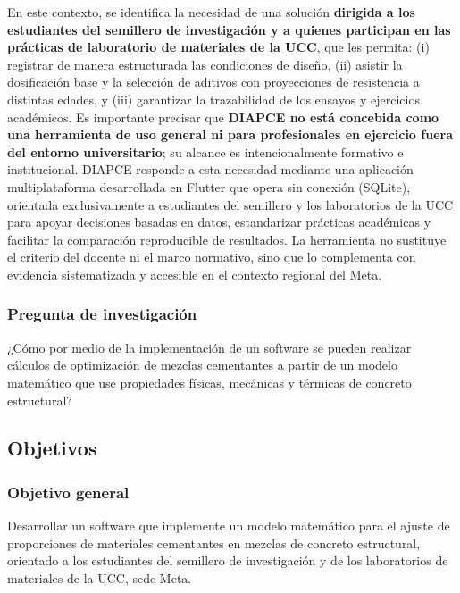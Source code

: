 En este contexto, se identifica la necesidad de una solución \textbf{dirigida a los estudiantes del semillero de investigación y a quienes participan en las prácticas de laboratorio de materiales de la UCC}, que les permita: (i) registrar de manera estructurada las condiciones de diseño, (ii) asistir la dosificación base y la selección de aditivos con proyecciones de resistencia a distintas edades, y (iii) garantizar la trazabilidad de los ensayos y ejercicios académicos. Es importante precisar que \textbf{DIAPCE no está concebida como una herramienta de uso general ni para profesionales en ejercicio fuera del entorno universitario}; su alcance es intencionalmente formativo e institucional. DIAPCE responde a esta necesidad mediante una aplicación multiplataforma desarrollada en Flutter que opera sin conexión (SQLite), orientada exclusivamente a estudiantes del semillero y los laboratorios de la UCC para apoyar decisiones basadas en datos, estandarizar prácticas académicas y facilitar la comparación reproducible de resultados. La herramienta no sustituye el criterio del docente ni el marco normativo, sino que lo complementa con evidencia sistematizada y accesible en el contexto regional del Meta.

\subsubsection*{Pregunta de investigación}
¿Cómo por medio de la implementación de un software se pueden realizar cálculos de optimización de mezclas cementantes a partir de un modelo matemático que use propiedades físicas, mecánicas y térmicas de concreto estructural?

\subsection{Objetivos}

\subsubsection{Objetivo general}
Desarrollar un software que implemente un modelo matemático para el ajuste de proporciones de materiales cementantes en mezclas de concreto estructural, orientado a los estudiantes del semillero de investigación y de los laboratorios de materiales de la UCC, sede Meta.

